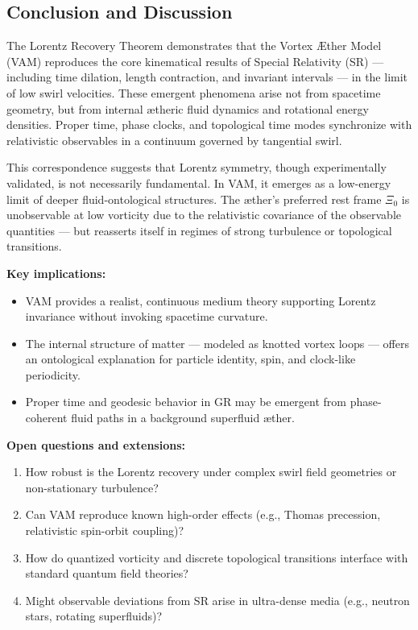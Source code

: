 \documentclass[12pt]{article}
\begin{document}
    \subsection*{Conclusion and Discussion}

    The Lorentz Recovery Theorem demonstrates that the Vortex Æther Model (VAM) reproduces the core kinematical results of Special Relativity (SR) — including time dilation, length contraction, and invariant intervals — in the limit of low swirl velocities. These emergent phenomena arise not from spacetime geometry, but from internal ætheric fluid dynamics and rotational energy densities. Proper time, phase clocks, and topological time modes synchronize with relativistic observables in a continuum governed by tangential swirl.

    This correspondence suggests that Lorentz symmetry, though experimentally validated, is not necessarily fundamental. In VAM, it emerges as a low-energy limit of deeper fluid-ontological structures. The æther's preferred rest frame \( \Xi_0 \) is unobservable at low vorticity due to the relativistic covariance of the observable quantities — but reasserts itself in regimes of strong turbulence or topological transitions.

    \textbf{Key implications:}
    \begin{itemize}
        \item VAM provides a realist, continuous medium theory supporting Lorentz invariance without invoking spacetime curvature.
        \item The internal structure of matter — modeled as knotted vortex loops — offers an ontological explanation for particle identity, spin, and clock-like periodicity.
        \item Proper time and geodesic behavior in GR may be emergent from phase-coherent fluid paths in a background superfluid æther.
    \end{itemize}

    \textbf{Open questions and extensions:}
    \begin{enumerate}
        \item How robust is the Lorentz recovery under complex swirl field geometries or non-stationary turbulence?
        \item Can VAM reproduce known high-order effects (e.g., Thomas precession, relativistic spin-orbit coupling)?
        \item How do quantized vorticity and discrete topological transitions interface with standard quantum field theories?
        \item Might observable deviations from SR arise in ultra-dense media (e.g., neutron stars, rotating superfluids)?
    \end{enumerate}
\end{document}
